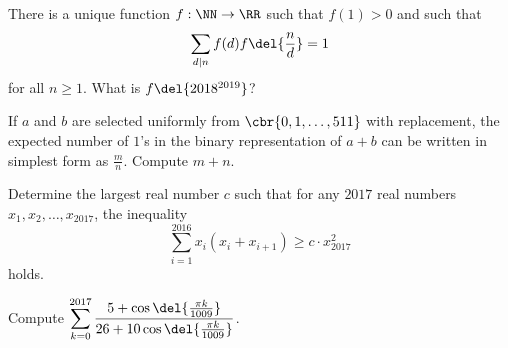 \documentclass[11pt,paper=letter]{scrartcl}
\begin{document}
\begin{mdframed}[style=exmdbox,frametitle={},  frametitlebelowskip = 0pt,splittopskip = 0pt,  innertopmargin = 5pt,]

\begin{problem}
  There is a unique function $f : \NN \to \RR$ such that $f(1) > 0$ and such that 
  $$\sum_{d \mid n} f(d)f\del{\frac nd} = 1$$
  for all $n \geq 1$. What is $f\del{2018^{2019}}$? \hint{\ref{h:14}}
\end{problem}


\begin{problem}
  If $a$ and $b$ are selected uniformly from $\cbr{0, 1, \ldots, 511}$ with replacement, the expected number of $1$'s in the binary representation of $a+b$ can be written in simplest form as $\frac mn$. Compute $m + n$.
\end{problem}

\begin{problem}
  Determine the largest real number $c$ such that for any $2017$ real numbers $x_1, x_2, \ldots, x_{2017}$, the inequality
  $$\sum_{i=1}^{2016} x_i(x_i + x_{i+1}) \geq c \cdot x^2_{2017}$$
  holds.
\end{problem}

\begin{problem}
  Compute $\displaystyle \sum_{k=0}^{2017} \dfrac{5 + \cos\del{\frac{\pi k}{1009}}}{26 + 10\cos\del{\frac{\pi k}{1009}}}$. \hint{\ref{h:15}}
\end{problem}

\end{mdframed}

\end{document}
